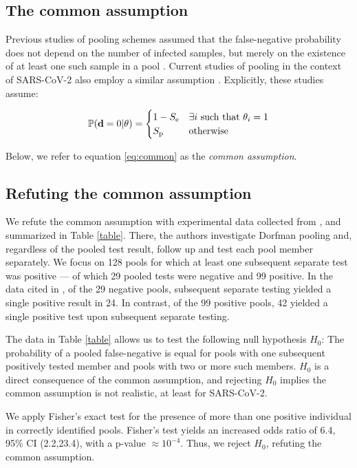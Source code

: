 \documentclass{article}
\begin{document}
\subsection*{The common assumption}\label{subsec:common}
Previous studies of pooling schemes assumed that the false-negative
probability does not depend on the number of infected samples, but
merely on the existence of at least one such sample in a pool
\cite{Kim, OptimalDorfmanPool}. Current studies of pooling in the
context of SARS-CoV-2 also employ a similar assumption
\cite{Simplistic1, Simplistic2}. Explicitly, these studies assume:

\begin{align}\label{eq:common}
  \mathbb{P}(\mathbf{d}=0|\theta) = 
  \begin{cases} 
    1-S_{\text{e}} & \exists i\ \text{such that } \theta_i = 1\\
    S_{\text{p}} & \text{otherwise}
  \end{cases} 
\end{align}

Below, we refer to equation \eqref{eq:common} as the \emph{common
  assumption}. 

\subsection*{Refuting the common assumption}\label{subsec:refute}
We refute the common assumption with experimental data collected from
\cite{Salazar}, and summarized in Table \ref{table}. There, the
authors investigate Dorfman pooling and, regardless of the pooled test
result, follow up and test each pool member separately. We focus on
128 pools for which at least one subsequent separate test was positive
--- of which 29 pooled tests were negative and 99 positive. In the
data cited in \cite{Salazar}, of the 29 negative pools, subsequent
separate testing yielded a single positive result in 24. In contrast,
of the 99 positive pools, 42 yielded a single positive test upon
subsequent separate testing.

The data in Table \ref{table} allows us to test the following null
hypothesis $H_0$: The probability of a pooled false-negative is equal
for pools with one subsequent positively tested member and pools with
two or more such members. $H_0$ is a direct consequence of the common
assumption, and rejecting $H_0$ implies the common assumption is not
realistic, at least for SARS-CoV-2.

We apply Fisher's exact test for the presence of more than one
positive individual in correctly identified pools. Fisher's test
yields an increased odds ratio of 6.4, 95\% CI (2.2,23.4), with a
p-value $\approx 10^{-4}$. Thus, we reject $H_0$, refuting the common
assumption.
\end{document}
